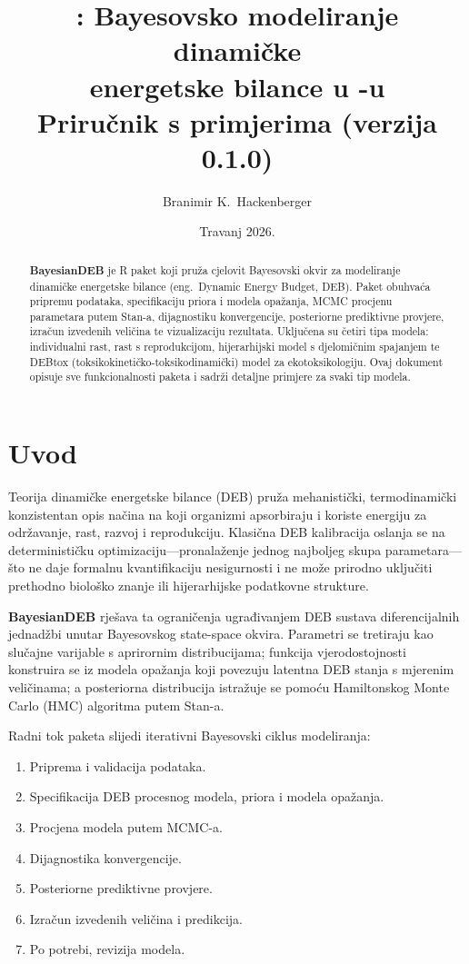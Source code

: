 \documentclass[11pt,a4paper]{article}
\title{\pkg{BayesianDEB}: Bayesovsko modeliranje dinamičke\\
       energetske bilance u \R-u\\[1ex]
       \large Priručnik s primjerima (verzija 0.1.0)}
\author{Branimir K.\ Hackenberger}
\date{Travanj 2026.}
\newcommand{\pkg}[1]{\textbf{#1}}
\newcommand{\R}{\textsf{R}}
\newcommand{\Stan}{\textsf{Stan}}
\begin{document}
\maketitle

\begin{abstract}
\pkg{BayesianDEB} je \R{} paket koji pruža cjelovit Bayesovski okvir za
modeliranje dinamičke energetske bilance (eng.\ Dynamic Energy Budget,
DEB).  Paket obuhvaća pripremu podataka, specifikaciju priora i modela
opažanja, MCMC procjenu parametara putem \Stan{}-a, dijagnostiku
konvergencije, posteriorne prediktivne provjere, izračun izvedenih
veličina te vizualizaciju rezultata.  Uključena su četiri tipa modela:
individualni rast, rast s reprodukcijom, hijerarhijski model s
djelomičnim spajanjem te DEBtox (toksikokinetičko-toksikodinamički) model
za ekotoksikologiju.  Ovaj dokument opisuje sve funkcionalnosti paketa i
sadrži detaljne primjere za svaki tip modela.
\end{abstract}

\tableofcontents
\newpage


\section{Uvod}
\label{sec:uvod}

Teorija dinamičke energetske bilance (DEB) pruža mehanistički,
termodinamički konzistentan opis načina na koji organizmi apsorbiraju i
koriste energiju za održavanje, rast, razvoj i reprodukciju.  Klasična
DEB kalibracija oslanja se na determinističku optimizaciju---pronalaženje
jednog najboljeg skupa parametara---što ne daje formalnu kvantifikaciju
nesigurnosti i ne može prirodno uključiti prethodno biološko znanje ili
hijerarhijske podatkovne strukture.

\pkg{BayesianDEB} rješava ta ograničenja ugrađivanjem DEB sustava
diferencijalnih jednadžbi unutar Bayesovskog state-space okvira.
Parametri se tretiraju kao slučajne varijable s aprirornim distribucijama;
funkcija vjerodostojnosti konstruira se iz modela opažanja koji povezuju
latentna DEB stanja s mjerenim veličinama; a posteriorna distribucija
istražuje se pomoću Hamiltonskog Monte Carlo (HMC) algoritma putem
\Stan{}-a.

Radni tok paketa slijedi iterativni Bayesovski ciklus modeliranja:
\begin{enumerate}[nosep]
  \item Priprema i validacija podataka.
  \item Specifikacija DEB procesnog modela, priora i modela opažanja.
  \item Procjena modela putem MCMC-a.
  \item Dijagnostika konvergencije.
  \item Posteriorne prediktivne provjere.
  \item Izračun izvedenih veličina i predikcija.
  \item Po potrebi, revizija modela.
\end{enumerate}
\end{document}

